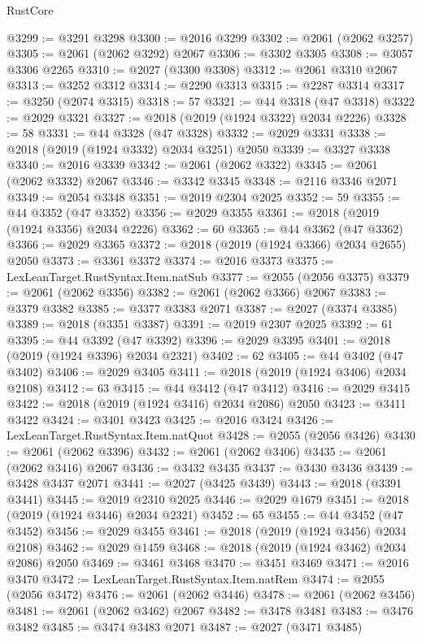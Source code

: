 \begin{lexlean}{RustCore}
\begin{coremodule}
@3299 := @3291 @3298
@3300 := @2016 @3299
@3302 := @2061 (@2062 @3257)
@3305 := @2061 (@2062 @3292) @2067
@3306 := @3302 @3305
@3308 := @3057 @3306 @2265
@3310 := @2027 (@3300 @3308)
@3312 := @2061 @3310 @2067
@3313 := @3252 @3312
@3314 := @2290 @3313
@3315 := @2287 @3314
@3317 := @3250 (@2074 @3315)
@3318 := 57
@3321 := @44 @3318 (@47 @3318)
@3322 := @2029 @3321
@3327 := @2018 (@2019 (@1924 @3322) @2034 @2226)
@3328 := 58
@3331 := @44 @3328 (@47 @3328)
@3332 := @2029 @3331
@3338 := @2018 (@2019 (@1924 @3332) @2034 @3251) @2050
@3339 := @3327 @3338
@3340 := @2016 @3339
@3342 := @2061 (@2062 @3322)
@3345 := @2061 (@2062 @3332) @2067
@3346 := @3342 @3345
@3348 := @2116 @3346 @2071
@3349 := @2054 @3348
@3351 := @2019 @2304 @2025
@3352 := 59
@3355 := @44 @3352 (@47 @3352)
@3356 := @2029 @3355
@3361 := @2018 (@2019 (@1924 @3356) @2034 @2226)
@3362 := 60
@3365 := @44 @3362 (@47 @3362)
@3366 := @2029 @3365
@3372 := @2018 (@2019 (@1924 @3366) @2034 @2655) @2050
@3373 := @3361 @3372
@3374 := @2016 @3373
@3375 := LexLeanTarget.RustSyntax.Item.natSub
@3377 := @2055 (@2056 @3375)
@3379 := @2061 (@2062 @3356)
@3382 := @2061 (@2062 @3366) @2067
@3383 := @3379 @3382
@3385 := @3377 @3383 @2071
@3387 := @2027 (@3374 @3385)
@3389 := @2018 (@3351 @3387)
@3391 := @2019 @2307 @2025
@3392 := 61
@3395 := @44 @3392 (@47 @3392)
@3396 := @2029 @3395
@3401 := @2018 (@2019 (@1924 @3396) @2034 @2321)
@3402 := 62
@3405 := @44 @3402 (@47 @3402)
@3406 := @2029 @3405
@3411 := @2018 (@2019 (@1924 @3406) @2034 @2108)
@3412 := 63
@3415 := @44 @3412 (@47 @3412)
@3416 := @2029 @3415
@3422 := @2018 (@2019 (@1924 @3416) @2034 @2086) @2050
@3423 := @3411 @3422
@3424 := @3401 @3423
@3425 := @2016 @3424
@3426 := LexLeanTarget.RustSyntax.Item.natQuot
@3428 := @2055 (@2056 @3426)
@3430 := @2061 (@2062 @3396)
@3432 := @2061 (@2062 @3406)
@3435 := @2061 (@2062 @3416) @2067
@3436 := @3432 @3435
@3437 := @3430 @3436
@3439 := @3428 @3437 @2071
@3441 := @2027 (@3425 @3439)
@3443 := @2018 (@3391 @3441)
@3445 := @2019 @2310 @2025
@3446 := @2029 @1679
@3451 := @2018 (@2019 (@1924 @3446) @2034 @2321)
@3452 := 65
@3455 := @44 @3452 (@47 @3452)
@3456 := @2029 @3455
@3461 := @2018 (@2019 (@1924 @3456) @2034 @2108)
@3462 := @2029 @1459
@3468 := @2018 (@2019 (@1924 @3462) @2034 @2086) @2050
@3469 := @3461 @3468
@3470 := @3451 @3469
@3471 := @2016 @3470
@3472 := LexLeanTarget.RustSyntax.Item.natRem
@3474 := @2055 (@2056 @3472)
@3476 := @2061 (@2062 @3446)
@3478 := @2061 (@2062 @3456)
@3481 := @2061 (@2062 @3462) @2067
@3482 := @3478 @3481
@3483 := @3476 @3482
@3485 := @3474 @3483 @2071
@3487 := @2027 (@3471 @3485)

\end{coremodule}
\end{lexlean}
